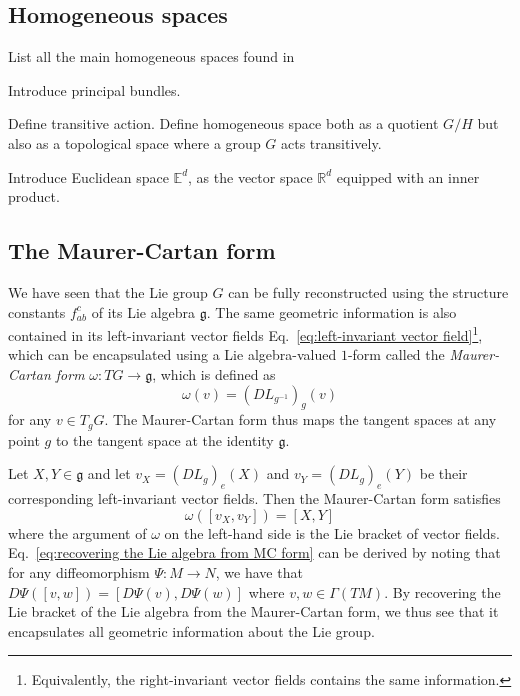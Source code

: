 
\subsection{Homogeneous spaces}

List all the main homogeneous spaces found in

Introduce principal bundles.

Define transitive action. Define homogeneous space both as a quotient $G/H$ but also as a topological space where a group $G$ acts transitively.

Introduce Euclidean space $\mathbb{E}^d$, as the vector space $\mathbb{R}^d$ equipped with an inner product.

\subsection{The Maurer-Cartan form} \label{sec:The Maurer-Cartan form}

We have seen that the Lie group $G$ can be fully reconstructed using the structure constants $f_{ab}^c$ of its Lie algebra $\mathfrak{g}$. The same geometric information is also contained in its left-invariant vector fields Eq.~\ref{eq:left-invariant vector field}\footnote{Equivalently, the right-invariant vector fields contains the same information.}, which can be encapsulated using a Lie algebra-valued $1$-form called the \textit{Maurer-Cartan form} $\omega : TG \to \mathfrak{g}$, which is defined as
\begin{equation} \label{eq:Maurer-Cartan form}
\omega(v) = (DL_{g^{-1}})_g (v)
\end{equation}
for any $v \in T_g G$. The Maurer-Cartan form thus maps the tangent spaces at any point $g$ to the tangent space at the identity $\mathfrak{g}$.

Let $X, Y \in \mathfrak{g}$ and let $v_X = (DL_g)_e(X)$ and $v_Y = (DL_g)_e(Y)$ be their corresponding left-invariant vector fields. Then the Maurer-Cartan form satisfies
\begin{equation} \label{eq:recovering the Lie algebra from MC form}
\omega([v_X, v_Y]) = [X, Y]
\end{equation}
where the argument of $\omega$ on the left-hand side is the Lie bracket of vector fields. Eq.~\ref{eq:recovering the Lie algebra from MC form} can be derived by noting that for any diffeomorphism $\Psi : M \to N$, we have that $D\Psi([v,w]) = [D\Psi(v), D\Psi(w)]$ where $v,w \in \Gamma(TM)$. By recovering the Lie bracket of the Lie algebra from the Maurer-Cartan form, we thus see that it encapsulates all geometric information about the Lie group.

